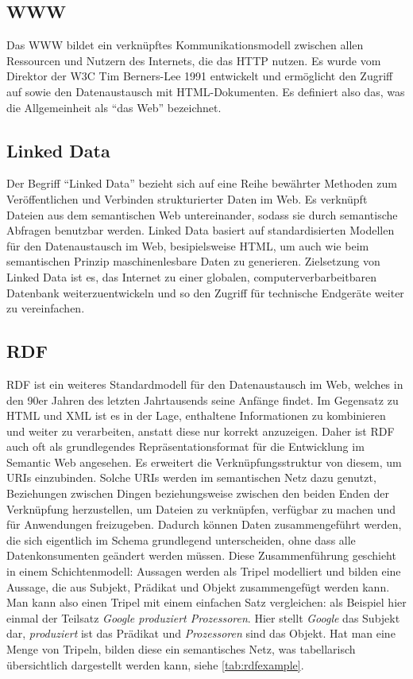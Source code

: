 \documentclass[headsepline,titlepage,ngerman,twoside,12pt]{report}
\begin{document}
\subsection{\acs{WWW}}
\label{sub:www}
Das \ac{WWW} bildet ein verknüpftes Kommunikationsmodell zwischen allen Ressourcen und Nutzern des Internets, die das \ac{HTTP} nutzen.
Es wurde vom Direktor der \ac{W3C} Tim Berners-Lee 1991 entwickelt und ermöglicht den Zugriff auf sowie den Datenaustausch mit \acs{HTML}-Dokumenten.
Es definiert also das, was die Allgemeinheit als \enquote{das Web} bezeichnet.


\subsection{Linked Data}
\label{sub:linkeddata}
Der Begriff \enquote{Linked Data} bezieht sich auf eine Reihe bewährter Methoden zum Veröffentlichen und Verbinden strukturierter Daten im Web.
Es verknüpft Dateien aus dem semantischen Web untereinander, sodass sie durch semantische Abfragen benutzbar werden.
Linked Data basiert auf standardisierten Modellen für den Datenaustausch im Web, besipielsweise \acs{HTML}, um auch wie beim semantischen Prinzip maschinenlesbare Daten zu generieren.
Zielsetzung von Linked Data ist es, das Internet zu einer globalen, computerverbarbeitbaren Datenbank weiterzuentwickeln und so den Zugriff für technische Endgeräte weiter zu vereinfachen.

\subsection{\acs{RDF}}
\label{sub:rdf}
\ac{RDF} ist ein weiteres Standardmodell für den Datenaustausch im Web, welches in den 90er Jahren des letzten Jahrtausends seine Anfänge findet.
Im Gegensatz zu \ac{HTML} und \ac{XML} ist es in der Lage, enthaltene Informationen zu kombinieren und weiter zu verarbeiten, anstatt diese nur korrekt anzuzeigen.
Daher ist RDF auch oft als grundlegendes Repräsentationsformat für die Entwicklung im Semantic Web angesehen.
Es erweitert die Verknüpfungsstruktur von diesem, um \ac{URIs} einzubinden.
Solche URIs werden im semantischen Netz dazu genutzt, Beziehungen zwischen Dingen beziehungsweise zwischen den beiden Enden der Verknüpfung herzustellen, um Dateien zu verknüpfen, verfügbar zu machen und für Anwendungen freizugeben.
Dadurch können Daten zusammengeführt werden, die sich eigentlich im Schema grundlegend unterscheiden, ohne dass alle Datenkonsumenten geändert werden müssen.
Diese Zusammenführung geschieht in einem Schichtenmodell: Aussagen werden als Tripel modelliert und bilden eine Aussage, die aus Subjekt, Prädikat und Objekt zusammengefügt werden kann.
Man kann also einen Tripel mit einem einfachen Satz vergleichen: als Beispiel hier einmal der Teilsatz \textit{Google produziert Prozessoren}.
Hier stellt \textit{Google} das Subjekt dar, \textit{produziert} ist das Prädikat und \textit{Prozessoren} sind das Objekt.
Hat man eine Menge von Tripeln, bilden diese ein semantisches Netz, was tabellarisch übersichtlich dargestellt werden kann, siehe \cref{tab:rdfexample}.
\end{document}
